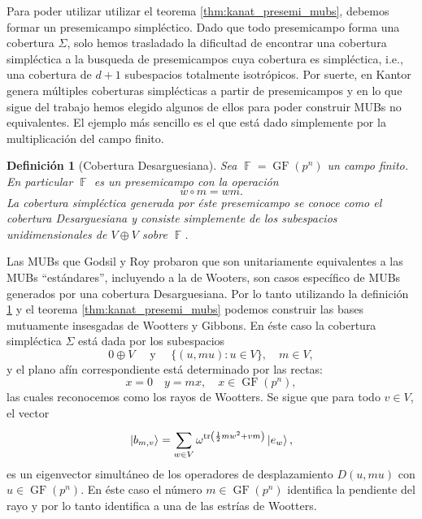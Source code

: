 \documentclass[a4paper,11pt]{report}
\DeclareMathOperator{\F}{\mathbb{F}}
\DeclareMathOperator{\tr}{tr}
\DeclareMathOperator{\GF}{GF}
\newtheorem{definition}{Definición}
\begin{document}
  Para poder utilizar utilizar el teorema
  \ref{thm:kanat_presemi_mubs}, debemos formar un
  presemicampo simpléctico. Dado que todo presemicampo forma
  una cobertura $\Sigma$, solo hemos trasladado la
  dificultad de encontrar una cobertura simpléctica a la
  busqueda de presemicampos cuya cobertura es simpléctica,
  i.e., una cobertura de $d+1$ subespacios totalmente
  isotrópicos. Por suerte, en \cite{kantor1982} Kantor
  genera múltiples coberturas simplécticas a partir de
  presemicampos y en lo que sigue del trabajo hemos elegido
  algunos de ellos para poder construir MUBs no
  equivalentes. El ejemplo más sencillo es el que está dado
  simplemente por la multiplicación del campo finito.
  \begin{definition}[Cobertura Desarguesiana]
    \label{def:desarguesian_semifield}
    Sea $\F = \GF(p^{n})$ un campo finito. En particular
    $\F$ es un presemicampo con la operación
    \begin{equation}
      w \circ m = w m.
    \end{equation}
    La cobertura simpléctica generada por éste presemicampo
    se conoce como el cobertura Desarguesiana y consiste
    simplemente de los subespacios unidimensionales de $V
    \oplus V$ sobre $\F$.
  \end{definition}
  Las MUBs que Godsil y Roy probaron que son unitariamente
  equivalentes a las MUBs ``estándares'', incluyendo a la de
  Wooters, son casos específico de MUBs generados por una
  cobertura Desarguesiana. Por lo tanto utilizando la
  definición \ref{def:desarguesian_semifield} y el teorema
  \ref{thm:kanat_presemi_mubs} podemos construir las bases
  mutuamente insesgadas de Wootters y Gibbons. En éste caso
  la cobertura simpléctica $\Sigma$ está dada por los
  subespacios
  \begin{equation}
    0 \oplus V
    \quad \text{ y } \quad
    \{(u,mu) : u \in V\},
    \quad m \in V,
  \end{equation}
  y el plano afín correspondiente está determinado por las
  rectas:
  \begin{equation}
    x = 0
    \quad
    y = mx,
    \quad
    x \in \GF(p^{n}),
  \end{equation}
  las cuales reconocemos como los rayos de Wootters. Se
  sigue que para todo $v \in V$, el vector
  \begin{equation}
    \label{eqn:desargues_vectors}
    \ket{b_{m,v}}
    = \sum_{w \in V}^{} \omega^{\tr\left( \frac{1}{2} m w^2
    + v m\right) } \ket{e_w},
  \end{equation} 
  es un eigenvector simultáneo de los operadores de
  desplazamiento $D(u,mu)$ con $u \in \GF(p^{n})$. En éste
  caso el número $m \in \GF(p^{n})$ identifica la pendiente
  del rayo y por lo tanto identifica a una de las estrías de
  Wootters.
\end{document}
